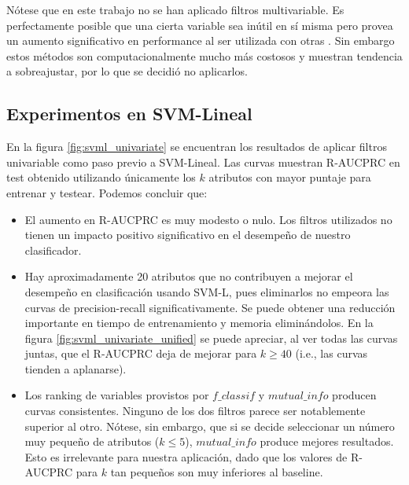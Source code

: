 Nótese que en este trabajo no se han aplicado filtros multivariable. Es perfectamente posible que una cierta variable sea inútil en sí misma pero provea un aumento significativo en performance al ser utilizada con otras \cite{fs3}. Sin embargo estos métodos son computacionalmente mucho más costosos y muestran tendencia a sobreajustar, por lo que se decidió no aplicarlos. 

\subsection{Experimentos en SVM-Lineal}

En la figura \ref{fig:svml_univariate} se encuentran los resultados de aplicar filtros univariable como paso previo a SVM-Lineal. Las curvas muestran R-AUCPRC en test obtenido utilizando únicamente los $k$ atributos con mayor puntaje para entrenar y testear. Podemos concluir que:

\begin{itemize}
\item El aumento en R-AUCPRC es muy modesto o nulo. Los filtros utilizados no tienen un impacto positivo significativo en el desempeño de nuestro clasificador.
\item Hay aproximadamente 20 atributos que no contribuyen a mejorar el desempeño en clasificación usando SVM-L, pues eliminarlos no empeora las curvas de precision-recall significativamente. Se puede obtener una reducción importante en tiempo de entrenamiento y memoria eliminándolos. En la figura \ref{fig:svml_univariate_unified} se puede apreciar, al ver todas las curvas juntas, que el R-AUCPRC deja de mejorar para $k\geq40$ (i.e., las curvas tienden a aplanarse).
\item Los ranking de variables provistos por $f\_classif$ y $mutual\_info$ producen curvas consistentes. Ninguno de los dos filtros parece ser notablemente superior al otro. Nótese, sin embargo, que si se decide seleccionar un número muy pequeño de atributos ($k\leq5$), $mutual\_info$ produce mejores resultados. Esto es irrelevante para nuestra aplicación, dado que los valores de R-AUCPRC para $k$ tan pequeños son muy inferiores al baseline.
\end{itemize}

